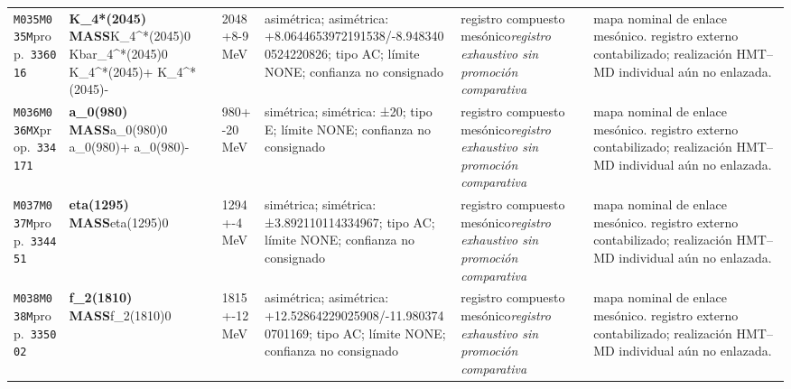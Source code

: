 \begin{landscape}
\begin{longtable}{L{1.85cm}L{4.45cm}L{2.35cm}L{4.05cm}L{3.35cm}L{7.15cm}}
\texttt{M035}\newline \texttt{M035M}\newline prop.\ \texttt{336016} & \textbf{K\_\allowbreak{}4*(2045) MASS}\newline K\_\allowbreak{}4\textasciicircum{}*(2045)0 \textbar{}\allowbreak{} Kbar\_\allowbreak{}4\textasciicircum{}*(2045)0 \textbar{}\allowbreak{} K\_\allowbreak{}4\textasciicircum{}*(2045)+ \textbar{}\allowbreak{} K\_\allowbreak{}4\textasciicircum{}*(2045)- & 2048+8-9\,MeV & asimétrica; asimétrica: +8.0644653972191538/-8.9483400524220826; tipo AC; límite NONE; confianza no consignado & registro compuesto mesónico\newline \emph{registro exhaustivo sin promoción comparativa} & mapa nominal de enlace mesónico. registro externo contabilizado; realización HMT--MD individual aún no enlazada. \\
\texttt{M036}\newline \texttt{M036MX}\newline prop.\ \texttt{334171} & \textbf{a\_\allowbreak{}0(980) MASS}\newline a\_\allowbreak{}0(980)0 \textbar{}\allowbreak{} a\_\allowbreak{}0(980)+ \textbar{}\allowbreak{} a\_\allowbreak{}0(980)- & 980+-20\,MeV & simétrica; simétrica: ±20; tipo E; límite NONE; confianza no consignado & registro compuesto mesónico\newline \emph{registro exhaustivo sin promoción comparativa} & mapa nominal de enlace mesónico. registro externo contabilizado; realización HMT--MD individual aún no enlazada. \\
\texttt{M037}\newline \texttt{M037M}\newline prop.\ \texttt{334451} & \textbf{eta(1295) MASS}\newline eta(1295)0 & 1294+-4\,MeV & simétrica; simétrica: ±3.892110114334967; tipo AC; límite NONE; confianza no consignado & registro compuesto mesónico\newline \emph{registro exhaustivo sin promoción comparativa} & mapa nominal de enlace mesónico. registro externo contabilizado; realización HMT--MD individual aún no enlazada. \\
\texttt{M038}\newline \texttt{M038M}\newline prop.\ \texttt{335002} & \textbf{f\_\allowbreak{}2(1810) MASS}\newline f\_\allowbreak{}2(1810)0 & 1815+-12\,MeV & asimétrica; asimétrica: +12.52864229025908/-11.9803740701169; tipo AC; límite NONE; confianza no consignado & registro compuesto mesónico\newline \emph{registro exhaustivo sin promoción comparativa} & mapa nominal de enlace mesónico. registro externo contabilizado; realización HMT--MD individual aún no enlazada. \\

\end{longtable}
\end{landscape}
